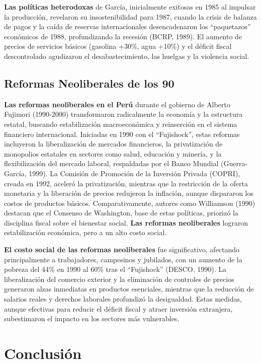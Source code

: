 \documentclass[
  jou,
  floatsintext,
  longtable,
  a4paper,
  nolmodern,
  notxfonts,
  notimes,
  colorlinks=true,linkcolor=blue,citecolor=blue,urlcolor=blue]{apa7}
\begin{document}
\textbf{Las políticas heterodoxas} de García, inicialmente exitosas en
1985 al impulsar la producción, revelaron su insostenibilidad para 1987,
cuando la crisis de balanza de pagos y la caída de reservas
internacionales desencadenaron los ``paquetazos'' económicos de 1988,
profundizando la recesión (BCRP, 1989). El aumento de precios de
servicios básicos (gasolina +30\%, agua +10\%) y el déficit fiscal
descontrolado agudizaron el desabastecimiento, las huelgas y la
violencia social.

\subsection{Reformas Neoliberales de los
90}\label{reformas-neoliberales-de-los-90}

\textbf{Las reformas neoliberales en el Perú} durante el gobierno de
Alberto Fujimori (1990-2000) transformaron radicalmente la economía y la
estructura estatal, buscando estabilización macroeconómica y reinserción
en el sistema financiero internacional. Iniciadas en 1990 con el
``Fujishock'', estas reformas incluyeron la liberalización de mercados
financieros, la privatización de monopolios estatales en sectores como
salud, educación y minería, y la flexibilización del mercado laboral,
respaldadas por el Banco Mundial (Guerra-García, 1999). La Comisión de
Promoción de la Inversión Privada (COPRI), creada en 1992, aceleró la
privatización, mientras que la restricción de la oferta monetaria y la
liberación de precios redujeron la inflación, aunque dispararon los
costos de productos básicos. Comparativamente, autores como Williamson
(1990) destacan que el Consenso de Washington, base de estas políticas,
priorizó la disciplina fiscal sobre el bienestar social. \textbf{Las
reformas neoliberales} lograron estabilización económica, pero a un alto
costo social.

\textbf{El costo social de las reformas neoliberales} fue significativo,
afectando principalmente a trabajadores, campesinos y jubilados, con un
aumento de la pobreza del 44\% en 1990 al 60\% tras el ``Fujishock''
(DESCO, 1990). La liberalización del comercio exterior y la eliminación
de controles de precios generaron alzas inmediatas en productos
esenciales, mientras que la reducción de salarios reales y derechos
laborales profundizó la desigualdad. Estas medidas, aunque efectivas
para reducir el déficit fiscal y atraer inversión extranjera,
subestimaron el impacto en los sectores más vulnerables.

\section{Conclusión}\label{conclusiuxf3n}
\end{document}
